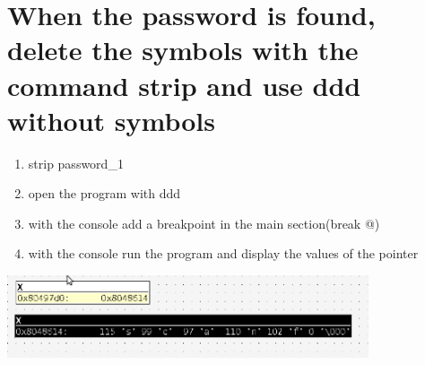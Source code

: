 \documentclass[a4paper,10pt]{article}
\begin{document}
		\section{When the password is found, delete the symbols with the command strip  and use ddd without symbols}
			\begin{enumerate}
				\item strip password\_1
				\item open the program with ddd
				\item with the console add a breakpoint in the main section(break @)
				\item with the console run the program and display the values of the pointer 
				\end{enumerate}
					\begin{center}
										 \includegraphics[width=0.8\textwidth]{./images/withoutDebug}
					\end{center}
\end{document}
